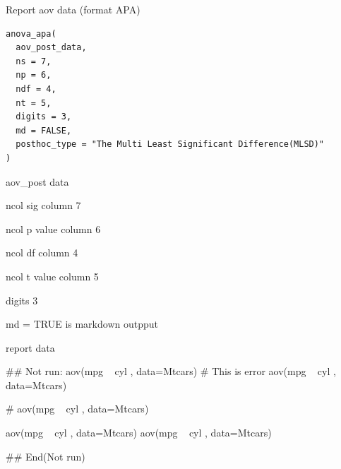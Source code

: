 \documentclass[a4paper]{book}
\begin{document}
%
\begin{Description}
Report aov data (format APA)
\end{Description}
%
\begin{Usage}
\begin{verbatim}
anova_apa(
  aov_post_data,
  ns = 7,
  np = 6,
  ndf = 4,
  nt = 5,
  digits = 3,
  md = FALSE,
  posthoc_type = "The Multi Least Significant Difference(MLSD)"
)
\end{verbatim}
\end{Usage}
%
\begin{Arguments}
\begin{ldescription}
\item[\code{aov\_post\_data}] aov\_post data

\item[\code{ns}] ncol sig column 7

\item[\code{np}] ncol p value column 6

\item[\code{ndf}] ncol df column 4

\item[\code{nt}] ncol t value column 5

\item[\code{digits}] digits 3

\item[\code{md}] md = TRUE is markdown outpput
\end{ldescription}
\end{Arguments}
%
\begin{Value}
report data
\end{Value}
%
\begin{Examples}
\begin{ExampleCode}
\#\# Not run: 
aov(mpg ~ cyl , data=Mtcars)%
# This is error
aov(mpg ~ cyl , data=Mtcars)%

# aov(mpg ~ cyl , data=Mtcars)%

aov(mpg ~ cyl , data=Mtcars)%
aov(mpg ~ cyl , data=Mtcars)%


## End(Not run)

\end{ExampleCode}
\end{Examples}
\end{document}
